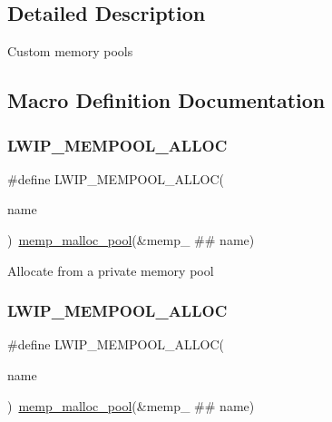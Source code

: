 \subsection{Detailed Description}
Custom memory pools 

\subsection{Macro Definition Documentation}
\mbox{\label{group__mempool_ga5e2498f6c17746c1fe7153de5f7f275a}} 
\subsubsection{\texorpdfstring{L\+W\+I\+P\+\_\+\+M\+E\+M\+P\+O\+O\+L\+\_\+\+A\+L\+L\+OC}{LWIP\_MEMPOOL\_ALLOC}\hspace{0.1cm}{\footnotesize\ttfamily [1/2]}}
{\footnotesize\ttfamily \#define L\+W\+I\+P\+\_\+\+M\+E\+M\+P\+O\+O\+L\+\_\+\+A\+L\+L\+OC(\begin{DoxyParamCaption}\item[{}]{name }\end{DoxyParamCaption})~\hyperlink{openmote-cc2538_2lwip_2src_2include_2lwip_2priv_2memp__priv_8h_a348c83ee972f1edf7296a1cdf1d75f22}{memp\+\_\+malloc\+\_\+pool}(\&memp\+\_\+ \#\# name)}

Allocate from a private memory pool \mbox{\label{group__mempool_ga5e2498f6c17746c1fe7153de5f7f275a}} 
\subsubsection{\texorpdfstring{L\+W\+I\+P\+\_\+\+M\+E\+M\+P\+O\+O\+L\+\_\+\+A\+L\+L\+OC}{LWIP\_MEMPOOL\_ALLOC}\hspace{0.1cm}{\footnotesize\ttfamily [2/2]}}
{\footnotesize\ttfamily \#define L\+W\+I\+P\+\_\+\+M\+E\+M\+P\+O\+O\+L\+\_\+\+A\+L\+L\+OC(\begin{DoxyParamCaption}\item[{}]{name }\end{DoxyParamCaption})~\hyperlink{openmote-cc2538_2lwip_2src_2include_2lwip_2priv_2memp__priv_8h_a348c83ee972f1edf7296a1cdf1d75f22}{memp\+\_\+malloc\+\_\+pool}(\&memp\+\_\+ \#\# name)}

